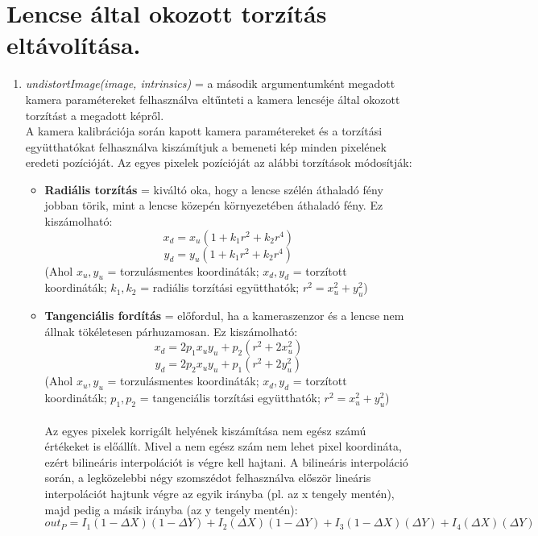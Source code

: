\documentclass[12pt]{report}
\begin{document}
        \section{Lencse által okozott torzítás eltávolítása.}
            \begin{enumerate}
                \item \textit{undistortImage(image, intrinsics)} = a második argumentumként megadott kamera paramétereket felhasználva eltűnteti a kamera lencséje által okozott torzítást a megadott képről.\\
                      A kamera kalibrációja során kapott kamera paramétereket és a torzítási együtthatókat felhasználva kiszámítjuk a bemeneti kép minden pixelének eredeti pozícióját. Az egyes pixelek pozícióját az alábbi torzítások módosítják:
                        \begin{itemize}
                            \item \textbf{Radiális torzítás} = kiváltó oka, hogy a lencse szélén áthaladó fény jobban törik, mint a lencse közepén környezetében áthaladó fény. Ez kiszámolható:\\
                                \[x_d = x_u(1 + k_1r^2 + k_2r^4)\]
                                \[y_d = y_u(1 + k_1r^2 + k_2r^4)\]
                                (Ahol $x_u, y_u$ = torzulásmentes koordináták; $x_d, y_d$ = torzított koordináták; $k_1, k_2$ = radiális torzítási együtthatók; $r^2 = x_u^2 + y_u^2$)
                            \item \textbf{Tangenciális fordítás} = előfordul, ha a kameraszenzor és a lencse nem állnak tökéletesen párhuzamosan. Ez kiszámolható:\\
                                \[x_d = 2p_1x_uy_u + p_2(r^2+2x_u^2)\]
                                \[y_d = 2p_2x_uy_u + p_1(r^2 + 2y_u^2)\]
                                (Ahol $x_u, y_u$ = torzulásmentes koordináták; $x_d, y_d$ = torzított koordináták; $p_1, p_2$ = tangenciális torzítási együtthatók; $r^2 = x_u^2 + y_u^2$)\\\\
                    Az egyes pixelek korrigált helyének kiszámítása nem egész számú értékeket is előállít. Mivel a nem egész szám nem lehet pixel koordináta, ezért bilineáris interpolációt is végre kell hajtani. A bilineáris interpoláció során, a legközelebbi négy szomszédot felhasználva először lineáris interpolációt hajtunk végre az egyik irányba (pl. az x tengely mentén), majd pedig a másik irányba (az y tengely mentén):
                        \[out_P = I_1(1 - \Delta X)(1 - \Delta Y) + I_2 (\Delta X)(1 - \Delta Y) + I_3(1 - \Delta X)(\Delta Y) + I_4(\Delta X)(\Delta Y)\]

\end{itemize}
\end{enumerate}
\end{document}
